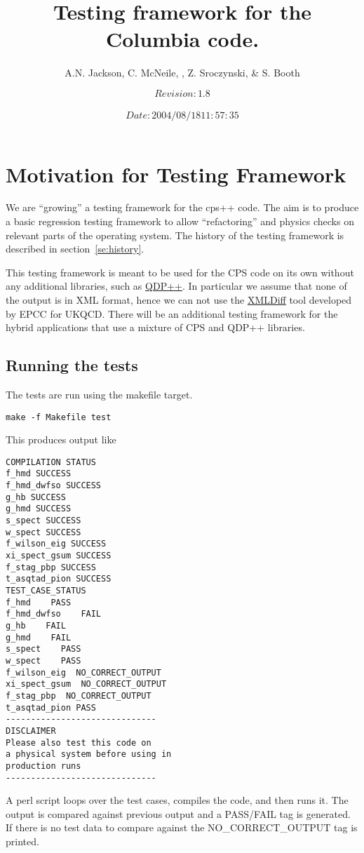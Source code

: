 \documentclass[12pt]{article}
\title{Testing framework for the Columbia code.}
\author{A.N. Jackson, C. McNeile, , Z. Sroczynski,  \& S. Booth}
\date{\mbox{\small $$Revision: 1.8 $$  $$Date: 2004/08/18 11:57:35 $$}}
\begin{document}
\maketitle

\tableofcontents
\newpage

\section{Motivation for Testing Framework}

We are ``growing'' a testing framework for the cps++ code.
The aim is to produce a basic regression testing framework to allow
``refactoring'' and physics checks on relevant parts of the operating
system.
The history of the testing framework is described in 
section~\ref{se:history}.


This testing framework is meant to be used for the CPS code on its own
without any additional libraries, such as 
\href{http://www.jlab.org/~edwards/qdp/}{QDP++}.
  In particular we
assume that none of the output is in XML format, hence we can not use the
\href{https://forge.nesc.ac.uk/projects/xmldiff/}{XMLDiff}
tool developed by EPCC for UKQCD.  There will be an additional
testing framework for the hybrid applications that use a mixture of
CPS and QDP++ libraries.

\subsection{Running the tests}

The tests are run using the makefile target.
\begin{verbatim}
make -f Makefile test
\end{verbatim}
This produces output like
\begin{verbatim}
COMPILATION STATUS
f_hmd SUCCESS
f_hmd_dwfso SUCCESS
g_hb SUCCESS
g_hmd SUCCESS
s_spect SUCCESS
w_spect SUCCESS
f_wilson_eig SUCCESS
xi_spect_gsum SUCCESS
f_stag_pbp SUCCESS
t_asqtad_pion SUCCESS
TEST_CASE_STATUS
f_hmd    PASS
f_hmd_dwfso    FAIL
g_hb    FAIL
g_hmd    FAIL
s_spect    PASS
w_spect    PASS
f_wilson_eig  NO_CORRECT_OUTPUT
xi_spect_gsum  NO_CORRECT_OUTPUT
f_stag_pbp  NO_CORRECT_OUTPUT
t_asqtad_pion PASS
------------------------------
DISCLAIMER
Please also test this code on
a physical system before using in
production runs
------------------------------
\end{verbatim}

A perl script loops over the test cases, compiles the code,
and then runs it. The output is compared against
previous output and a PASS/FAIL tag is generated.
If there is no test data to compare against the
NO\_CORRECT\_OUTPUT tag is printed.
\end{document}
